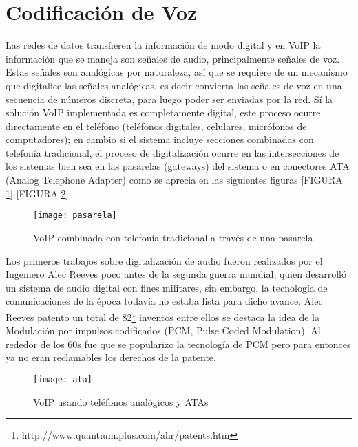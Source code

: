 	
\section{Codificación de Voz}

Las redes de datos transfieren la información de modo digital 
y en VoIP la información que se maneja son señales de audio, 
principalmente señales de voz. Estas señales son analógicas 
por naturaleza, así que se requiere de un mecanismo que 
digitalice las señales analógicas, es decir convierta las 
señales de voz en una secuencia de números discreta, para 
luego poder ser enviadas por la red. Sí la solución VoIP 
implementada es completamente digital, este proceso ocurre 
directamente en el teléfono (teléfonos digitales, celulares, 
micrófonos de computadores); en cambio si el sistema incluye 
secciones combinadas con telefonía tradicional, el proceso de 
digitalización ocurre en las intersecciones de los sistemas 
bien sea en las pasarelas (gateways) del sistema o en conectores 
ATA (Analog Telephone Adapter) como se aprecia en las siguientes 
figuras [FIGURA \ref{fig:pasarela}]  [FIGURA \ref{fig:ata}].

	\begin{figure}[h]
		
		\texttt{[image: pasarela]}
		
		\caption{VoIP combinada con telefonía tradicional a través de una pasarela}
		
		\centering
		
		\label{fig:pasarela}
	\end{figure}

Los primeros trabajos sobre digitalización de audio fueron realizados 
por el Ingeniero Alec Reeves poco antes de la segunda guerra mundial, quien desarrolló un sistema de audio digital con fines militares, 
sin embargo, la tecnología de comunicaciones de la época todavía 
no estaba lista para dicho avance. Alec Reeves patento un total 
de 82\footnote{ http://www.quantium.plus.com/ahr/patents.htm } 
inventos entre ellos se destaca la idea de la Modulación por 
impulsos codificados (PCM, Pulse Coded Modulation). Al rededor 
de los 60s fue que se popularizo la tecnología de PCM 
pero para entonces ya no eran reclamables los derechos de la 
patente. 

	
		\begin{figure}[h]
			
			\texttt{[image: ata]}
			
			\caption{VoIP usando teléfonos analógicos y ATAs}
			
			\centering
			
			\label{fig:ata}
		\end{figure}
		
